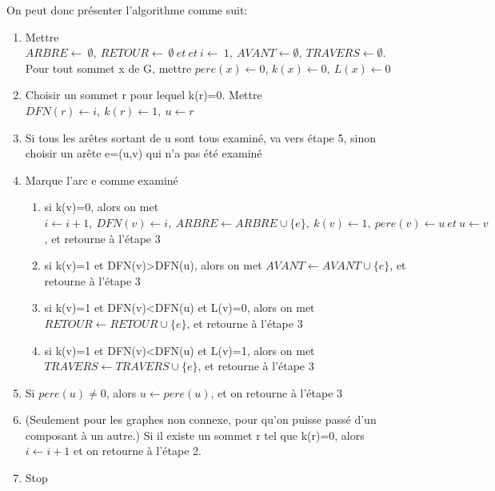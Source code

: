 On peut donc présenter l'algorithme comme suit:
\begin{enumerate}
	\item Mettre  $ARBRE \leftarrow\ \emptyset,\ RETOUR \leftarrow\ \emptyset\ et\ et\ i\leftarrow\ 1,\ AVANT\gets\emptyset,\ TRAVERS\gets\emptyset$. Pour tout sommet x de G, mettre $pere(x)\leftarrow 0$, $k(x)\leftarrow 0,\ L(x)\gets0$
	\item Choisir un sommet r pour lequel k(r)=0. Mettre  $DFN(r) \gets i,\ k(r) \gets 1,\ u \gets r$
	\item Si tous les arêtes sortant de u sont tous examiné, va vers étape 5, sinon  choisir un arête e=(u,v) qui n'a pas été examiné
	\item Marque l'arc e comme examiné
	\begin{enumerate}
		\item si k(v)=0, alors on met $i \gets i+1,\ DFN(v)\gets i,\ ARBRE\gets ARBRE \cup\{e\},\ k(v)\gets 1,\ pere(v)\gets u\ et\ u\gets v$, et retourne à l'étape 3
		\item si k(v)=1 et DFN(v)>DFN(u), alors on met $AVANT\gets AVANT\cup\{e\}$, et retourne à l'étape 3
		\item si k(v)=1 et DFN(v)<DFN(u) et L(v)=0, alors on met $RETOUR\gets RETOUR\cup\{e\}$, et retourne à l'étape 3
		\item si k(v)=1 et DFN(v)<DFN(u) et L(v)=1, alors on met $TRAVERS\gets TRAVERS\cup\{e\}$, et retourne à l'étape 3
	\end{enumerate}  
	\item Si $pere(u)\neq 0$, alors $u\gets pere(u)$, et on retourne à l'étape 3
	\item (Seulement pour les graphes non connexe, pour qu'on puisse passé d'un composant à un autre.) Si il existe un sommet r tel que k(r)=0, alors $i\gets i+1$ et on retourne à l'étape 2.
	\item Stop
\end{enumerate}















 
 